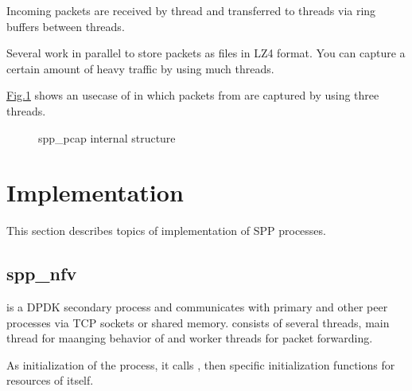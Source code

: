 \documentclass[a4paper,11pt,openany,oneside,english]{sphinxmanual}
\begin{document}
Incoming packets are received by  thread and transferred to
 threads via ring buffers between threads.

Several  work in parallel to store packets as files in LZ4
format. You can capture a certain amount of heavy traffic by using much
 threads.

\hyperref[\detokenize{design/spp_secondary:figure-spp-pcap-design}]{Fig.\@ \ref{\detokenize{design/spp_secondary:figure-spp-pcap-design}}} shows an usecase of  in which
packets from  are captured by using three  threads.

\begin{figure}[htbp]
\centering
\capstart

\noindent{}
\caption{spp\_pcap internal structure}\label{\detokenize{design/spp_secondary:id6}}\label{\detokenize{design/spp_secondary:figure-spp-pcap-design}}\end{figure}


\section{Implementation}
\label{\detokenize{design/impl/index:implementation}}\label{\detokenize{design/impl/index:spp-design-impl-index}}\label{\detokenize{design/impl/index::doc}}
This section describes topics of implementation of SPP processes.


\subsection{spp\_nfv}
\label{\detokenize{design/impl/spp_nfv:spp-nfv}}\label{\detokenize{design/impl/spp_nfv:design-impl-spp-nfv}}\label{\detokenize{design/impl/spp_nfv::doc}}
 is a DPDK secondary process and communicates with primary and
other peer processes via TCP sockets or shared memory.
 consists of several threads, main thread for maanging behavior of
 and worker threads for packet forwarding.

As initialization of the process, it calls , then specific
initialization functions for resources of  itself.
\end{document}
